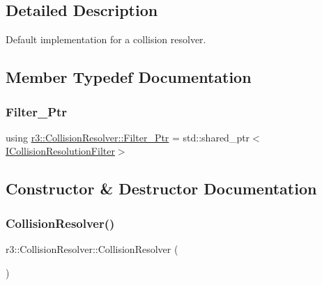 \subsection{Detailed Description}
Default implementation for a collision resolver. 

\subsection{Member Typedef Documentation}
\mbox{\label{classr3_1_1_collision_resolver_a5b3838b81de7909c3c78268801d61414}} 
\subsubsection{\texorpdfstring{Filter\+\_\+\+Ptr}{Filter\_Ptr}}
{\footnotesize\ttfamily using \mbox{\hyperlink{classr3_1_1_collision_resolver_a5b3838b81de7909c3c78268801d61414}{r3\+::\+Collision\+Resolver\+::\+Filter\+\_\+\+Ptr}} =  std\+::shared\+\_\+ptr$<$\mbox{\hyperlink{classr3_1_1_i_collision_resolution_filter}{I\+Collision\+Resolution\+Filter}}$>$}



\subsection{Constructor \& Destructor Documentation}
\mbox{\label{classr3_1_1_collision_resolver_a7b90e276403fa8422879228a189432fb}} 
\subsubsection{\texorpdfstring{Collision\+Resolver()}{CollisionResolver()}}
{\footnotesize\ttfamily r3\+::\+Collision\+Resolver\+::\+Collision\+Resolver (\begin{DoxyParamCaption}{ }\end{DoxyParamCaption})\hspace{0.3cm}{\ttfamily [explicit]}}

